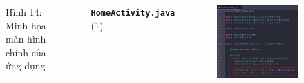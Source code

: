 \documentclass{beamer}
\begin{document}
\begin{frame}
\begin{columns}
\begin{figure}
            \caption{\centering\tiny{Hình 14: Minh họa màn hình chính của ứng dụng}}
        \end{figure}
        \indent \textbf{\texttt{HomeActivity.java}} (1)
        \begin{figure}
            \centering
            \includegraphics[width=\textwidth]{images/22.png}
        \end{figure}
    \end{columns}
\end{frame}
\end{document}
